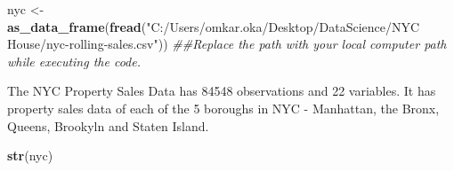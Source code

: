 \documentclass[
  a3paper,
]{article}
\newenvironment{Shaded}{\begin{snugshade}}{\end{snugshade}}
\newcommand{\CommentTok}[1]{\textcolor[rgb]{0.56,0.35,0.01}{\textit{#1}}}
\newcommand{\KeywordTok}[1]{\textcolor[rgb]{0.13,0.29,0.53}{\textbf{#1}}}
\newcommand{\NormalTok}[1]{#1}
\newcommand{\StringTok}[1]{\textcolor[rgb]{0.31,0.60,0.02}{#1}}
\begin{document}
\begin{Shaded}
\begin{Highlighting}[]
\NormalTok{nyc <-}\StringTok{ }
\StringTok{  }\KeywordTok{as_data_frame}\NormalTok{(}\KeywordTok{fread}\NormalTok{(}\StringTok{"C:/Users/omkar.oka/Desktop/DataScience/NYC House/nyc-rolling-sales.csv"}\NormalTok{)) }
\CommentTok{##Replace the path with your local computer path while executing the code.}
\end{Highlighting}
\end{Shaded}

\newpage

The NYC Property Sales Data has 84548 observations and 22 variables. It
has property sales data of each of the 5 boroughs in NYC - Manhattan,
the Bronx, Queens, Brookyln and Staten Island.

\begin{Shaded}
\begin{Highlighting}[]
\KeywordTok{str}\NormalTok{(nyc)}
\end{Highlighting}
\end{Shaded}
\end{document}
